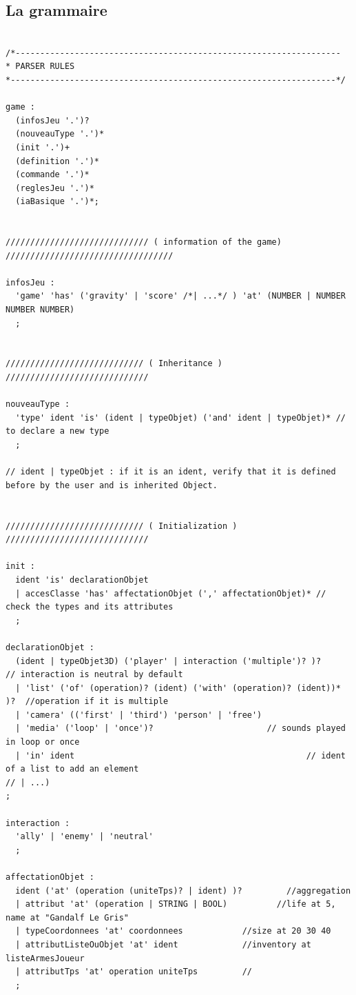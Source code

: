 \subsection{La grammaire}

\begin{lstlisting}[language=Grammar]

/*------------------------------------------------------------------
* PARSER RULES
*------------------------------------------------------------------*/
 
game :
  (infosJeu '.')?
  (nouveauType '.')*
  (init '.')+
  (definition '.')*
  (commande '.')*
  (reglesJeu '.')*
  (iaBasique '.')*;
 

///////////////////////////// ( information of the game)  //////////////////////////////////

infosJeu :
  'game' 'has' ('gravity' | 'score' /*| ...*/ ) 'at' (NUMBER | NUMBER NUMBER NUMBER)
  ;

 
//////////////////////////// ( Inheritance )  /////////////////////////////
 
nouveauType :
  'type' ident 'is' (ident | typeObjet) ('and' ident | typeObjet)* // to declare a new type
  ;            
  
// ident | typeObjet : if it is an ident, verify that it is defined before by the user and is inherited Object.

 
//////////////////////////// ( Initialization )  /////////////////////////////

init :
  ident 'is' declarationObjet
  | accesClasse 'has' affectationObjet (',' affectationObjet)* // check the types and its attributes
  ;
 
declarationObjet :
  (ident | typeObjet3D) ('player' | interaction ('multiple')? )?         // interaction is neutral by default
  | 'list' ('of' (operation)? (ident) ('with' (operation)? (ident))* )?  //operation if it is multiple 
  | 'camera' (('first' | 'third') 'person' | 'free')
  | 'media' ('loop' | 'once')? 						 // sounds played in loop or once
  | 'in' ident 				                                 // ident of a list to add an element
// | ...)
;           
 
interaction :
  'ally' | 'enemy' | 'neutral'
  ;
 
affectationObjet :
  ident ('at' (operation (uniteTps)? | ident) )?         //aggregation
  | attribut 'at' (operation | STRING | BOOL)          //life at 5, name at "Gandalf Le Gris"
  | typeCoordonnees 'at' coordonnees            //size at 20 30 40
  | attributListeOuObjet 'at' ident             //inventory at listeArmesJoueur
  | attributTps 'at' operation uniteTps         //
  ;
 

\end{lstlisting}
